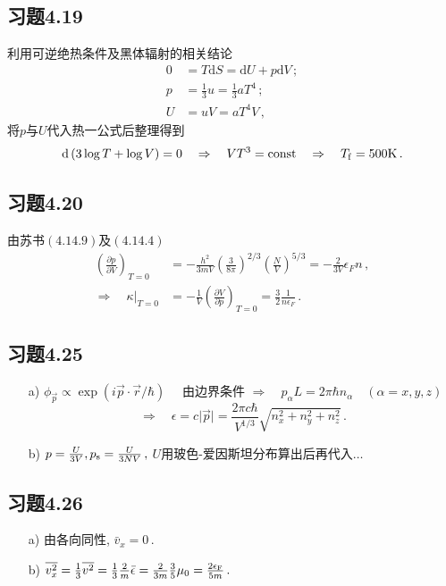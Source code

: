 \documentclass[letterpaper, 10pt]{article}
\newcommand{\dd}{\mathrm{d}}
\begin{document}
\subsection{习题4.19}
利用可逆绝热条件及黑体辐射的相关结论
\begin{align*}
0 & =  T \dd S = \dd U + p\dd V \,; \\
p & = \frac{1}{3} u = \frac{1}{3} a T^{4} \,; \\
U & = uV = a T^{4} V \,,
\end{align*}
将$p$与$U$代入热一公式后整理得到
\[ \dd \left( 3 \log{T} + \log{V} \right) = 0 \quad{} \Rightarrow \quad{} VT^{3} = {\rm const} \quad{} \Rightarrow \quad{} T_{\rm f} = 500 {\rm K}\,. \]

\subsection{习题4.20}
由苏书$(4.14.9)$及$(4.14.4)$
\begin{align*}
\left( \frac{\partial p}{\partial V} \right)_{T=0} & = - \frac{h^{2}}{3mV} \left( \frac{3}{8\pi} \right)^{2/3} \left( \frac{N}{V} \right)^{5/3} = - \frac{2}{3V} \epsilon_{F} n \,, \\
\Rightarrow \quad{} \kappa\rvert_{T=0} & = - \frac{1}{V} \left( \frac{\partial V}{\partial p} \right)_{T=0} = \frac{3}{2} \frac{1}{n\epsilon_{F}}\,.
\end{align*}

\subsection{习题4.25}
\begin{itemize}
	\item[a)]
	$\phi_{\vec{p}} \propto \exp{(i \vec{p} \cdot \vec{r} / \hbar)} \quad{}$ 由边界条件 $\Rightarrow \quad{} p_{\alpha} L = 2\pi\hbar n_{\alpha}\quad{} (\alpha = x, y, z)$
	\[ \Rightarrow \quad{} \epsilon = c\lvert{\vec{p}}\rvert = \frac{2\pi c\hbar}{V^{1/3}} \sqrt{n_{x}^{2}+n_{y}^{2}+n_{z}^{2}}\,. \]
	\item[b)]
	$p=\frac{U}{3V}, p_{\rm s}=\frac{U}{3NV}\,,$ $U$用玻色-爱因斯坦分布算出后再代入$\dots$
\end{itemize}

\subsection{习题4.26}
\begin{itemize}
	\item[a)]
	由各向同性, $\bar{v}_{x} = 0\,.$
	\item[b)]
	$\overline{v_{x}^{2}} = \frac{1}{3} \overline{v^{2}} = \frac{1}{3} \frac{2}{m} \bar{\epsilon} = \frac{2}{3m} \frac{3}{5} \mu_{0} = \frac{2\epsilon_{\rm F}}{5m}\,.$
\end{itemize}
\end{document}
